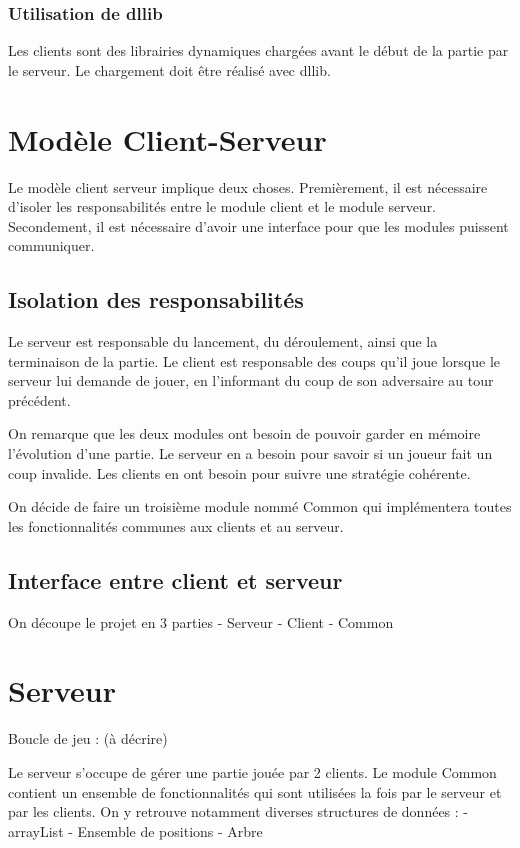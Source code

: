 \documentclass{article}
\begin{document}
\subsubsection{Utilisation de dllib}

Les clients sont des librairies dynamiques chargées avant le début de la partie par le serveur.
Le chargement doit être réalisé avec dllib.

\section{Modèle Client-Serveur}

Le modèle client serveur implique deux choses.
Premièrement, il est nécessaire d'isoler les responsabilités entre le module client et le module serveur.
Secondement, il est nécessaire d'avoir une interface pour que les modules puissent communiquer.

\subsection{Isolation des responsabilités}

Le serveur est responsable du lancement, du déroulement, ainsi que la terminaison de la partie.
Le client est responsable des coups qu'il joue lorsque le serveur lui demande de jouer, 
en l'informant du coup de son adversaire au tour précédent.

On remarque que les deux modules ont besoin de pouvoir garder en mémoire l'évolution d'une partie.
Le serveur en a besoin pour savoir si un joueur fait un coup invalide.
Les clients en ont besoin pour suivre une stratégie cohérente.

On décide de faire un troisième module nommé Common qui implémentera toutes les fonctionnalités communes 
aux clients et au serveur.

\subsection{Interface entre client et serveur}


On découpe le projet en 3 parties
- Serveur
- Client
- Common


\section{Serveur}
Boucle de jeu : (à décrire)

Le serveur s'occupe de gérer une partie jouée par 2 clients. 
Le module Common contient un ensemble de fonctionnalités qui sont 
utilisées la fois par le serveur et par les clients. On y retrouve 
notamment diverses structures de données :
- arrayList
- Ensemble de positions
- Arbre
\end{document}
